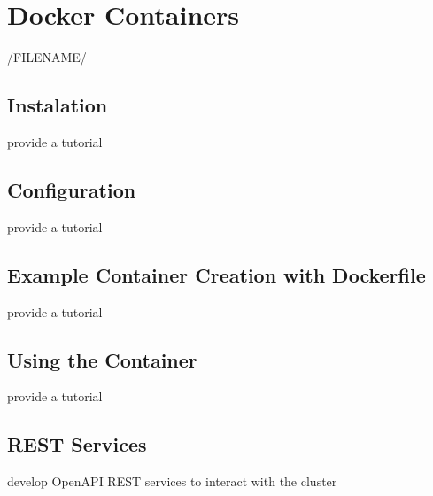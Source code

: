 \chapter{Docker Containers}

/FILENAME/

\section{Instalation}

\begin{exercise}
provide a tutorial 
\end{exercise}

\section{Configuration}

\begin{exercise}
provide a tutorial 
\end{exercise}

\section{Example Container Creation with Dockerfile}

\begin{exercise}
provide a tutorial 
\end{exercise}

\section{Using the Container}

\begin{exercise}
provide a tutorial 
\end{exercise}

\section{REST Services}

\begin{exercise}
develop OpenAPI REST services to interact with the cluster
\end{exercise}


